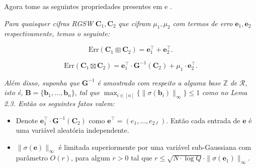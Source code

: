 Agora tome as seguintes propriedades presentes em \cite{lyubashevsky2013} e \cite{lw23I}.

\begin{lemma}
    \textit{Para quaisquer cifras RGSW} $\mathbf{C}_1, \mathbf{C}_2$ \textit{que cifram} $\mu_1, \mu_2$ \textit{com termos de erro} $\mathbf{e}_1, \mathbf{e}_2$ \textit{respectivamente, temos o seguinte:}

    \[
    \text{Err}(\mathbf{C}_1 \boxplus \mathbf{C}_2) = \mathbf{e}_1^\top + \mathbf{e}_2^\top.
    \]

    \[
    \text{Err}(\mathbf{C}_1 \boxtimes \mathbf{C}_2) = \mathbf{e}_1^\top \cdot \mathbf{G}^{-1}(\mathbf{C}_2) + \mu_1 \cdot \mathbf{e}_2^\top.
    \]

    \textit{Além disso, suponha que} $\mathbf{G}^{-1}$ \textit{é amostrado com respeito a alguma base} $\mathbb{Z}$ \textit{de} $\mathcal{R}$, \textit{isto é,} $\mathbf{B} = \{ \mathbf{b}_1, \dots, \mathbf{b}_n \}$, \textit{tal que} $\max_{i \in [n]} \{ \| \sigma(\mathbf{b}_i) \|_\infty \} \leq 1$ \textit{como no Lema 2.3. Então os seguintes fatos valem:}

    \begin{itemize}
    \item Denote $\mathbf{e}_1^\top \cdot \mathbf{G}^{-1}(\mathbf{C}_2)$ como $\mathbf{e}^\top = (e_1, \dots, e_{2\ell})$. Então cada entrada de $\mathbf{e}$ é uma variável aleatória independente.

    \item $\|\sigma(\mathbf{e})\|_\infty$ é limitada superiormente por uma variável sub-Gaussiana com parâmetro $O(r)$, para algum $r > 0$ tal que $r \leq \sqrt{N \cdot \log Q} \cdot \|\sigma(\mathbf{e}_1)\|_\infty$.
    \end{itemize}
\end{lemma}


